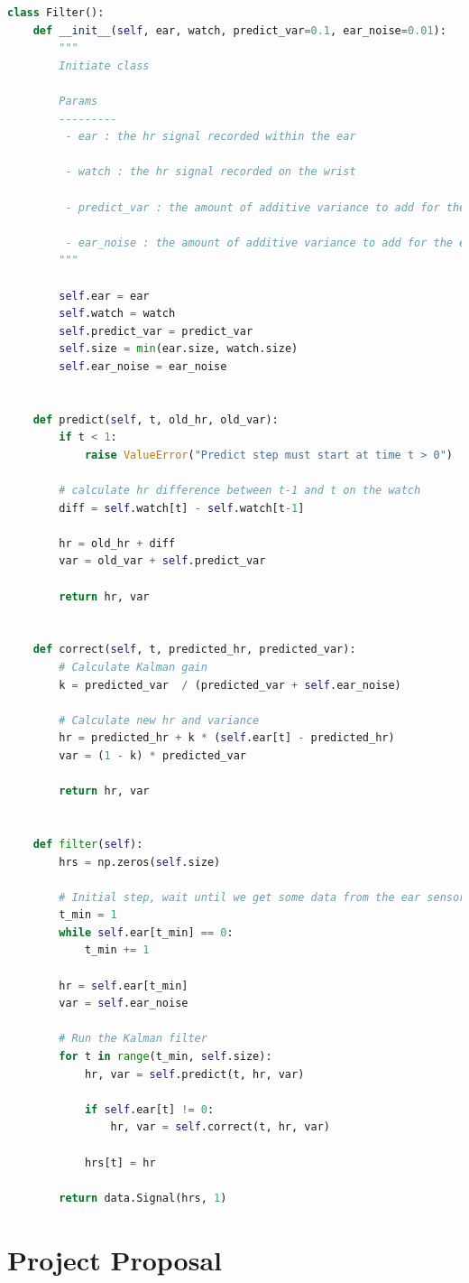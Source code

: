 \documentclass[12pt,a4paper,twoside,openany]{report}
\begin{document}
\begin{lstlisting}[language=Python]
class Filter():
    def __init__(self, ear, watch, predict_var=0.1, ear_noise=0.01):
        """
        Initiate class

        Params
        ---------
         - ear : the hr signal recorded within the ear

         - watch : the hr signal recorded on the wrist

         - predict_var : the amount of additive variance to add for the prediction step

         - ear_noise : the amount of additive variance to add for the ear correct step
        """

        self.ear = ear
        self.watch = watch
        self.predict_var = predict_var
        self.size = min(ear.size, watch.size)
        self.ear_noise = ear_noise


    def predict(self, t, old_hr, old_var):
        if t < 1:
            raise ValueError("Predict step must start at time t > 0")

        # calculate hr difference between t-1 and t on the watch
        diff = self.watch[t] - self.watch[t-1]

        hr = old_hr + diff
        var = old_var + self.predict_var

        return hr, var


    def correct(self, t, predicted_hr, predicted_var):
        # Calculate Kalman gain
        k = predicted_var  / (predicted_var + self.ear_noise)

        # Calculate new hr and variance
        hr = predicted_hr + k * (self.ear[t] - predicted_hr)
        var = (1 - k) * predicted_var

        return hr, var


    def filter(self):
        hrs = np.zeros(self.size)

        # Initial step, wait until we get some data from the ear sensor before starting the filter
        t_min = 1
        while self.ear[t_min] == 0:
            t_min += 1

        hr = self.ear[t_min]
        var = self.ear_noise

        # Run the Kalman filter
        for t in range(t_min, self.size):
            hr, var = self.predict(t, hr, var)

            if self.ear[t] != 0:
                hr, var = self.correct(t, hr, var)

            hrs[t] = hr

        return data.Signal(hrs, 1)

\end{lstlisting}



\chapter{Project Proposal}


\end{document}
